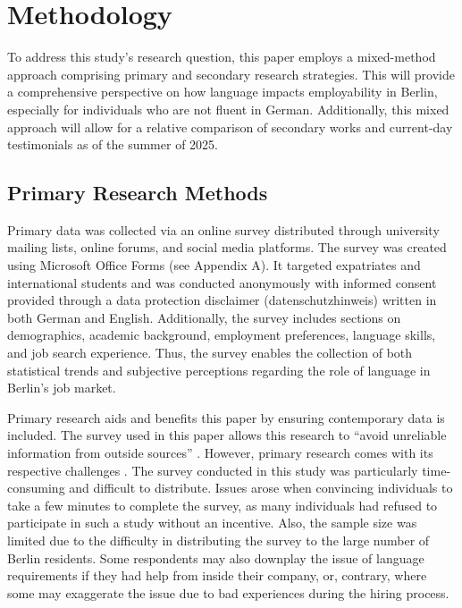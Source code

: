 \chapter{Methodology}

To address this study’s research question, this paper employs a mixed-method approach comprising primary and secondary research strategies. This will provide a comprehensive perspective on how language impacts employability in Berlin, especially for individuals who are not fluent in German. Additionally, this mixed approach will allow for a relative comparison of secondary works and current-day testimonials as of the summer of 2025.

\section{Primary Research Methods}
Primary data was collected via an online survey distributed through university mailing lists, online forums, and social media platforms. The survey was created using Microsoft Office Forms (see Appendix A). It targeted expatriates and international students and was conducted anonymously with informed consent provided through a data protection disclaimer (datenschutzhinweis) written in both German and English. Additionally, the survey includes sections on demographics, academic background, employment preferences, language skills, and job search experience. Thus, the survey enables the collection of both statistical trends and subjective perceptions regarding the role of language in Berlin’s job market.

Primary research aids and benefits this paper by ensuring contemporary data is included. The survey used in this paper allows this research to “avoid unreliable information from outside sources” \citep{Indeed25}. However, primary research comes with its respective challenges \citep{k2024crucial}. The survey conducted in this study was particularly time-consuming and difficult to distribute. Issues arose when convincing individuals to take a few minutes to complete the survey, as many individuals had refused to participate in such a study without an incentive. Also, the sample size was limited due to the difficulty in distributing the survey to the large number of Berlin residents. Some respondents may also downplay the issue of language requirements if they had help from inside their company, or, contrary, where some may exaggerate the issue due to bad experiences during the hiring process.

